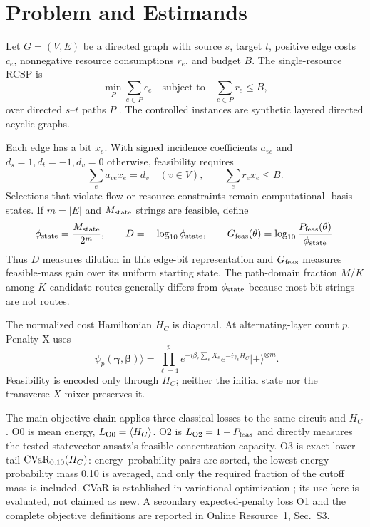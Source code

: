 \section{Problem and Estimands}
\label{sec:problem}

Let $G=(V,E)$ be a directed graph with source $s$, target $t$, positive edge
costs $c_e$, nonnegative resource consumptions $r_e$, and budget $B$. The
single-resource RCSP is
\begin{equation}
  \min_{P}\sum_{e\in P}c_e
  \quad\text{subject to}\quad
  \sum_{e\in P}r_e\leq B,
  \label{eq:rcsp}
\end{equation}
over directed $s$--$t$ paths $P$ \cite{beasley1989rcsp}. The controlled
instances are synthetic layered directed acyclic graphs.

Each edge has a bit $x_e$. With signed incidence coefficients $a_{ve}$ and
$d_s=1,d_t=-1,d_v=0$ otherwise, feasibility requires
\begin{equation}
  \sum_e a_{ve}x_e=d_v\quad(v\in V),
  \qquad \sum_e r_ex_e\leq B.
  \label{eq:constraints}
\end{equation}
Selections that violate flow or resource constraints remain computational-
basis states. If $m=|E|$ and $M_{\rm state}$ strings are feasible, define
\begin{equation}
  \phi_{\mathrm{state}}=\frac{M_{\rm state}}{2^m},\qquad
  D=-\log_{10}\phi_{\mathrm{state}},\qquad
  G_{\mathrm{feas}}(\theta)=\log_{10}\frac{P_{\mathrm{feas}}(\theta)}{\phi_{\mathrm{state}}}.
  \label{eq:dilution}
\end{equation}
Thus $D$ measures dilution in this edge-bit representation and $G_{\mathrm{feas}}$
measures feasible-mass gain over its uniform starting state. The path-domain
fraction $M/K$ among $K$ candidate routes generally differs from
$\phi_{\mathrm{state}}$ because most bit strings are not routes.

The normalized cost Hamiltonian $H_C$ is diagonal. At alternating-layer count
$p$, Penalty-X uses
\begin{equation}
  \lvert\psi_p(\boldsymbol\gamma,\boldsymbol\beta)\rangle
  =\prod_{\ell=1}^{p}e^{-i\beta_\ell\sum_eX_e}
   e^{-i\gamma_\ell H_C}\lvert+\rangle^{\otimes m}.
  \label{eq:qaoa}
\end{equation}
Feasibility is encoded only through $H_C$; neither the initial state nor the
transverse-$X$ mixer preserves it.

The main objective chain applies three classical losses to the same circuit
and $H_C$. O0 is mean energy,
$L_{\rm O0}=\langle H_C\rangle$. O2 is
$L_{\rm O2}=1-P_{\mathrm{feas}}$ and directly measures the tested statevector ansatz's
feasible-concentration capacity. O3 is exact lower-tail
$\operatorname{CVaR}_{0.10}(H_C)$: energy--probability pairs are sorted, the lowest-energy
probability mass 0.10 is averaged, and only the required fraction of the
cutoff mass is included. CVaR is established in variational optimization
\cite{barkoutsos2020cvar}; its use here is evaluated, not claimed as new. A
secondary expected-penalty loss O1 and the complete objective definitions are
reported in Online Resource~1, Sec.~S3.


